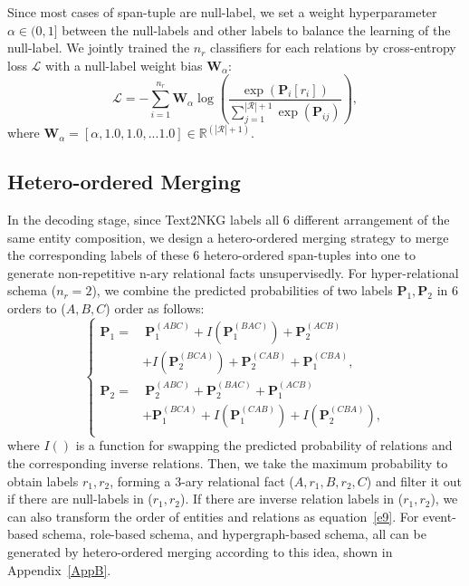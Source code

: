 \documentclass{article} \usepackage{iclr2024_conference,times}
\begin{document}
Since most cases of span-tuple are null-label, we set a weight hyperparameter $\alpha \in (0,1]$ between the null-labels and other labels to balance the learning of the null-label. We jointly trained the $n_r$ classifiers for each relations by cross-entropy loss $\mathcal{L}$ with a null-label weight bias $\mathbf{W}_{\alpha}$: 
\begin{equation}
\mathcal{L}=-\sum_{i=1}^{n_r}\mathbf{W}_{\alpha} \log\left( \frac{\exp \left(\mathbf{P}_i[r_i]\right)}{\sum_{j=1}^{|\mathcal{R}|+1} \exp \left(\mathbf{P}_{ij}\right)}\right) ,
\end{equation}
where $\mathbf{W}_{\alpha}=[\alpha,1.0,1.0,...1.0]\in \mathbb{R}^{(|\mathcal{R}|+1)}$.




\subsection{Hetero-ordered Merging}
In the decoding stage, since Text2NKG labels all 6 different arrangement of the same entity composition, we design a hetero-ordered merging strategy to merge the corresponding labels of these 6 hetero-ordered span-tuples into one to generate non-repetitive n-ary relational facts unsupervisedly. For hyper-relational schema ($n_r=2$), we combine the predicted probabilities of two labels $\mathbf{P}_{1},\mathbf{P}_{2}$ in 6 orders to ($A,B,C$) order as follows:
\begin{equation}
\left\{
\begin{aligned}
\mathbf{P}_{1}=&\ \mathbf{P}_1^{(ABC)}+I(\mathbf{P}_1^{(BAC)})+\mathbf{P}_2^{(ACB)}\\
&+I(\mathbf{P}_2^{(BCA)})+\mathbf{P}_2^{(CAB)}+\mathbf{P}_1^{(CBA)},\\
\mathbf{P}_{2}=&\ \mathbf{P}_2^{(ABC)}+\mathbf{P}_2^{(BAC)}+\mathbf{P}_1^{(ACB)}\\
&+\mathbf{P}_1^{(BCA)}+I(\mathbf{P}_1^{(CAB)})+I(\mathbf{P}_2^{(CBA)}),\\
\end{aligned}
\right.
\end{equation}
where $I()$ is a function for swapping the predicted probability of relations and the corresponding inverse relations. Then, we take the maximum probability to obtain labels $r_1,r_2$, forming a 3-ary relational fact ($A,r_1,B,r_2,C$) and filter it out if there are null-labels in ($r_1,r_2$). If there are inverse relation labels in ($r_1,r_2$), we can also transform the order of entities and relations as equation~\ref{e9}. For event-based schema, role-based schema, and hypergraph-based schema, all can be generated by hetero-ordered merging according to this idea, shown in Appendix~\ref{AppB}.
\end{document}
